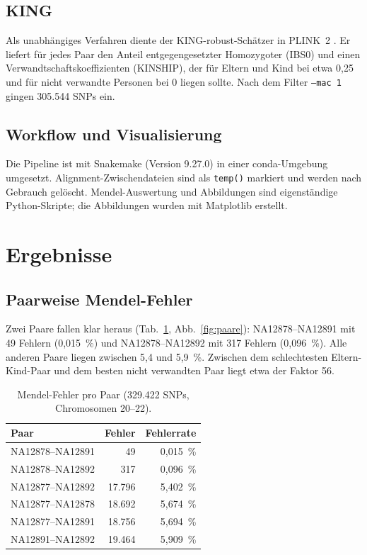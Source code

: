 \documentclass[10pt,a4paper,twocolumn]{article}
\begin{document}
\subsection{KING}
Als unabhängiges Verfahren diente der KING-robust-Schätzer \citep{manichaikul2010} in PLINK~2 \citep{chang2015}. Er liefert für jedes Paar den Anteil entgegengesetzter Homozygoter (IBS0) und einen Verwandtschaftskoeffizienten (KINSHIP), der für Eltern und Kind bei etwa 0,25 und für nicht verwandte Personen bei 0 liegen sollte. Nach dem Filter \texttt{--mac 1} gingen 305.544 SNPs ein.

\subsection{Workflow und Visualisierung}
Die Pipeline ist mit Snakemake \citep{molder2021} (Version 9.27.0) in einer conda-Umgebung umgesetzt. Alignment-Zwischendateien sind als \texttt{temp()} markiert und werden nach Gebrauch gelöscht. Mendel-Auswertung und Abbildungen sind eigenständige Python-Skripte; die Abbildungen wurden mit Matplotlib \citep{hunter2007} erstellt.

\section{Ergebnisse}
\subsection{Paarweise Mendel-Fehler}
Zwei Paare fallen klar heraus (Tab.~\ref{tab:paare}, Abb.~\ref{fig:paare}): NA12878--NA12891 mit 49 Fehlern (0,015~\%) und NA12878--NA12892 mit 317 Fehlern (0,096~\%). Alle anderen Paare liegen zwischen 5,4 und 5,9~\%. Zwischen dem schlechtesten Eltern-Kind-Paar und dem besten nicht verwandten Paar liegt etwa der Faktor 56.

\begin{table}[t]
\centering
\small
\caption{Mendel-Fehler pro Paar (329.422 SNPs, Chromosomen 20--22).}
\label{tab:paare}
\begin{tabular}{@{}lrr@{}}
\toprule
Paar & Fehler & Fehlerrate\\
\midrule
NA12878--NA12891 & 49 & 0,015~\%\\
NA12878--NA12892 & 317 & 0,096~\%\\
\addlinespace
NA12877--NA12892 & 17.796 & 5,402~\%\\
NA12877--NA12878 & 18.692 & 5,674~\%\\
NA12877--NA12891 & 18.756 & 5,694~\%\\
NA12891--NA12892 & 19.464 & 5,909~\%\\
\bottomrule
\end{tabular}
\end{table}
\end{document}
